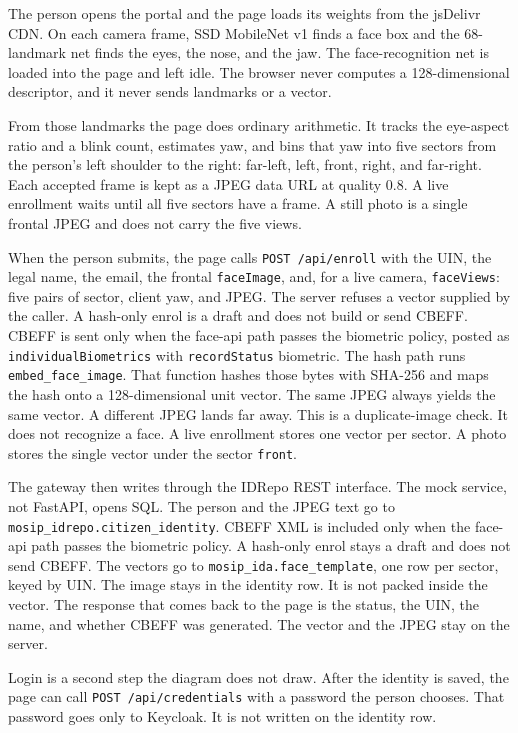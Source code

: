\documentclass[11pt]{article}
\begin{document}
The person opens the portal and the page loads its weights from the jsDelivr CDN. On each camera frame, SSD MobileNet v1 finds a face box and the 68-landmark net finds the eyes, the nose, and the jaw. The face-recognition net is loaded into the page and left idle. The browser never computes a 128-dimensional descriptor, and it never sends landmarks or a vector.

From those landmarks the page does ordinary arithmetic. It tracks the eye-aspect ratio and a blink count, estimates yaw, and bins that yaw into five sectors from the person's left shoulder to the right: far-left, left, front, right, and far-right. Each accepted frame is kept as a JPEG data URL at quality 0.8. A live enrollment waits until all five sectors have a frame. A still photo is a single frontal JPEG and does not carry the five views.

When the person submits, the page calls \texttt{POST /api/enroll} with the UIN, the legal name, the email, the frontal \texttt{faceImage}, and, for a live camera, \texttt{faceViews}: five pairs of sector, client yaw, and JPEG. The server refuses a vector supplied by the caller. A hash-only enrol is a draft and does not build or send CBEFF. CBEFF is sent only when the face-api path passes the biometric policy, posted as \texttt{individualBiometrics} with \texttt{recordStatus} biometric. The hash path runs \texttt{embed\_face\_image}. That function hashes those bytes with SHA-256 and maps the hash onto a 128-dimensional unit vector. The same JPEG always yields the same vector. A different JPEG lands far away. This is a duplicate-image check. It does not recognize a face. A live enrollment stores one vector per sector. A photo stores the single vector under the sector \texttt{front}.

The gateway then writes through the IDRepo REST interface. The mock service, not FastAPI, opens SQL. The person and the JPEG text go to \texttt{mosip\_idrepo.citizen\_identity}. CBEFF XML is included only when the face-api path passes the biometric policy. A hash-only enrol stays a draft and does not send CBEFF. The vectors go to \texttt{mosip\_ida.face\_template}, one row per sector, keyed by UIN. The image stays in the identity row. It is not packed inside the vector. The response that comes back to the page is the status, the UIN, the name, and whether CBEFF was generated. The vector and the JPEG stay on the server.

Login is a second step the diagram does not draw. After the identity is saved, the page can call \texttt{POST /api/credentials} with a password the person chooses. That password goes only to Keycloak. It is not written on the identity row.
\end{document}
